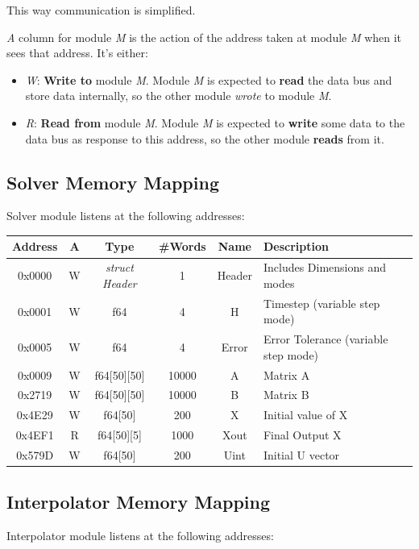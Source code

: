 \documentclass[12pt]{report}
\begin{document}
This way communication is simplified.

\emph{A} column for module \emph{M} is the action of the address taken at module \emph{M} when it sees that address. It's either:

\begin{itemize}
    \item \emph{W}: \textbf{Write to} module \emph{M}. Module \emph{M} is expected to \textbf{read} the data bus and store data internally, so the other module \emph{wrote} to module \emph{M}.
    \item \emph{R}: \textbf{Read from} module \emph{M}. Module \emph{M} is expected to \textbf{write} some data to the data bus as response to this address, so the other module \textbf{reads} from it.
\end{itemize}

\subsection{Solver Memory Mapping}
Solver module listens at the following addresses:

\begin{center}
 \begin{tabular}{||c| c| c| c| c| l||} 
 \hline
 Address & A & Type & \#Words & Name & Description  \\ [0.5ex] 
 \hline\hline
  0x0000 & W & \emph{struct Header} & 1 & Header & Includes Dimensions and modes  \\ 
 \hline
 0x0001  & W & f64 & 4 & H & Timestep (variable step mode)  \\
 \hline
 0x0005  & W & f64 & 4 & Error & Error Tolerance (variable step mode) \\
 \hline
 0x0009  & W & f64[50][50] & 10000 & A & Matrix A \\
 \hline
 0x2719  & W & f64[50][50] & 10000 & B & Matrix B \\
 \hline
 0x4E29  & W & f64[50] & 200 & X & Initial value of X \\
 \hline
 0x4EF1  & R & f64[50][5] & 1000 & Xout & Final Output X \\ [1ex] 
 \hline
 0x579D  & W & f64[50] & 200 & Uint & Initial U vector \\
 \hline
\end{tabular}
\end{center}

\subsection{Interpolator Memory Mapping}
Interpolator module listens at the following addresses:
\end{document}
